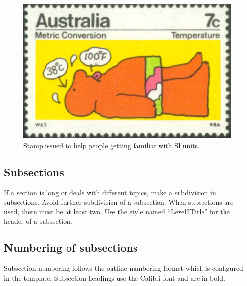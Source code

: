 \documentclass[10pt]{../imeko_acta}
\begin{document}
\begin{figure}
	\centering
	\includegraphics[width=0.68\linewidth]{image1}
	\caption{Stamp issued to help people getting familiar with SI units.}
	\label{fig:image1}
\end{figure}

	

\subsection{Subsections} \label{sec:sub1}

If a section is long or deals with different topics, make a subdivision in subsections. Avoid further subdivision of a subsection. When subsections are used, there must be at least two. Use the style named ``Level2Title'' for the header of a subsection.

\subsection{Numbering of subsections}

Subsection numbering follows the outline numbering format which is configured in the template. Subsection headings use the Calibri font and are in bold.
\end{document}
